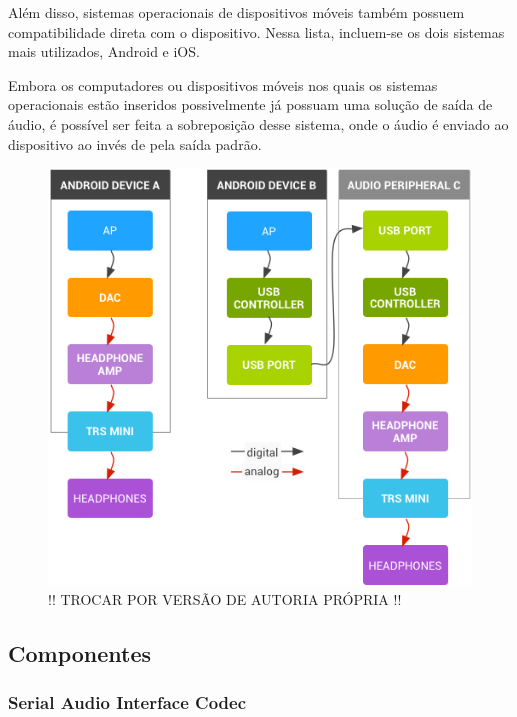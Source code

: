 Além disso, sistemas operacionais de dispositivos móveis também possuem compatibilidade direta com o dispositivo. Nessa lista, incluem-se os dois sistemas mais utilizados, Android e iOS.

Embora os computadores ou dispositivos móveis nos quais os sistemas operacionais estão inseridos possivelmente já possuam uma solução de saída de áudio, é possível ser feita a sobreposição desse sistema, onde o áudio é enviado ao dispositivo ao invés de pela saída padrão.

\begin{figure}[!h]
  \includegraphics[scale=0.5]{figuras/usb-android-dscs.png}
  \caption{!! TROCAR POR VERSÃO DE AUTORIA PRÓPRIA !!}
  \label{fig:synchronousMode}
\end{figure}


\subsection{Componentes}

\subsubsection{Serial Audio Interface Codec}


